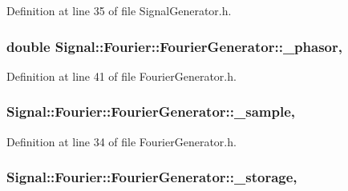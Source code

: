 Definition at line 35 of file Signal\+Generator.\+h.

\hypertarget{classSignal_1_1Fourier_1_1FourierGenerator_a5c5d5bb54df2a21f1a6142530adb08c3}{
\subsubsection[{\+\_\+phasor}]{\setlength{\rightskip}{0pt plus 5cm}double Signal\+::\+Fourier\+::\+Fourier\+Generator\+::\+\_\+phasor\hspace{0.3cm}{\ttfamily [protected]}, {\ttfamily [inherited]}}}\label{classSignal_1_1Fourier_1_1FourierGenerator_a5c5d5bb54df2a21f1a6142530adb08c3}


Definition at line 41 of file Fourier\+Generator.\+h.

\hypertarget{classSignal_1_1Fourier_1_1FourierGenerator_ad720bf2b268dc621ace64c54c0816597}{
\subsubsection[{\+\_\+sample}]{ Signal\+::\+Fourier\+::\+Fourier\+Generator\+::\+\_\+sample\hspace{0.3cm}{\ttfamily [protected]}, {\ttfamily [inherited]}}}\label{classSignal_1_1Fourier_1_1FourierGenerator_ad720bf2b268dc621ace64c54c0816597}


Definition at line 34 of file Fourier\+Generator.\+h.

\hypertarget{classSignal_1_1Fourier_1_1FourierGenerator_ab6e6b79cf56e31c9a1b5766f357f8cfb}{
\subsubsection[{\+\_\+storage}]{ Signal\+::\+Fourier\+::\+Fourier\+Generator\+::\+\_\+storage\hspace{0.3cm}{\ttfamily [protected]}, {\ttfamily [inherited]}}}\label{classSignal_1_1Fourier_1_1FourierGenerator_ab6e6b79cf56e31c9a1b5766f357f8cfb}


